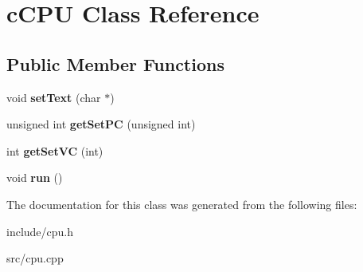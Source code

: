 \hypertarget{classcCPU}{\section{c\-C\-P\-U \-Class \-Reference}
\label{d2/dc6/classcCPU}
}
\subsection*{\-Public \-Member \-Functions}
\begin{DoxyCompactItemize}
\item 
\hypertarget{classcCPU_a3c9035d221a8b397fe61ac7a5b27ada8}{void {\bfseries set\-Text} (char $\ast$)}\label{d2/dc6/classcCPU_a3c9035d221a8b397fe61ac7a5b27ada8}

\item 
\hypertarget{classcCPU_a588fd27244641135cb96b69e84ba098d}{unsigned int {\bfseries get\-Set\-P\-C} (unsigned int)}\label{d2/dc6/classcCPU_a588fd27244641135cb96b69e84ba098d}

\item 
\hypertarget{classcCPU_a87e2f020db032ce66d218c28ffc34625}{int {\bfseries get\-Set\-V\-C} (int)}\label{d2/dc6/classcCPU_a87e2f020db032ce66d218c28ffc34625}

\item 
\hypertarget{classcCPU_aee300d68026ba9f13d5434ff82f0372a}{void {\bfseries run} ()}\label{d2/dc6/classcCPU_aee300d68026ba9f13d5434ff82f0372a}

\end{DoxyCompactItemize}


\-The documentation for this class was generated from the following files\-:\begin{DoxyCompactItemize}
\item 
include/cpu.\-h\item 
src/cpu.\-cpp\end{DoxyCompactItemize}
